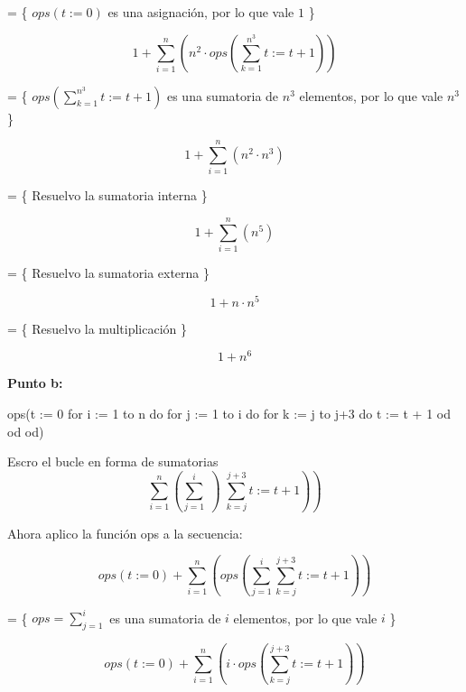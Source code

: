 \documentclass{article}
\begin{document}
= \{ $ops(t := 0)$ es una asignación, por lo que vale $1$ \}

\begin{equation*}
  1 + \sum_{i=1}^{n} \left(  n^2 \cdot ops \left(\sum_{k=1}^{n^3} t := t+1 \right) \right)
\end{equation*}

= \{ $ops \left(\sum_{k=1}^{n^3} t := t+1 \right)$ es una sumatoria de $n^3$ elementos, por lo que vale $n^3$ \}

\begin{equation*}
  1 + \sum_{i=1}^{n} \left(  n^2 \cdot n^3 \right)
\end{equation*}

= \{ Resuelvo la sumatoria interna \}

\begin{equation*}
  1 + \sum_{i=1}^{n} \left(  n^5 \right)
\end{equation*}

= \{ Resuelvo la sumatoria externa \}

\begin{equation*}
  1 + n \cdot n^5
\end{equation*}

= \{ Resuelvo la multiplicación \}

\begin{equation*}
  1 + n^6
\end{equation*}

\newpage

\textbf{Punto b:}
\begin{pascallike}
  ops(t := 0
  for i := 1 to n do
    for j := 1 to i do
      for k := j to j+3 do
        t := t + 1
      od
    od
  od)
\end{pascallike}
Escro el bucle en forma de sumatorias
\begin{equation*}
  \sum_{i=1}^{n} \left(  \sum_{j=1}^{i} \left) \sum_{k=j}^{j+3} t := t+1 \right) \right)
\end{equation*}

Ahora aplico la función ops a la secuencia:

\begin{equation*}
  ops(t := 0) + \sum_{i=1}^{n} \left(  ops\left(\sum_{j=1}^{i} \sum_{k=j}^{j+3} t := t+1 \right) \right)
\end{equation*}

= \{ $ops=\sum_{j=1}^{i}$ es una sumatoria de $i$ elementos, por lo que vale $i$ \}

\begin{equation*}
  ops(t := 0) + \sum_{i=1}^{n} \left(  i \cdot ops \left(\sum_{k=j}^{j+3} t := t+1 \right) \right)
\end{equation*}
\end{document}

